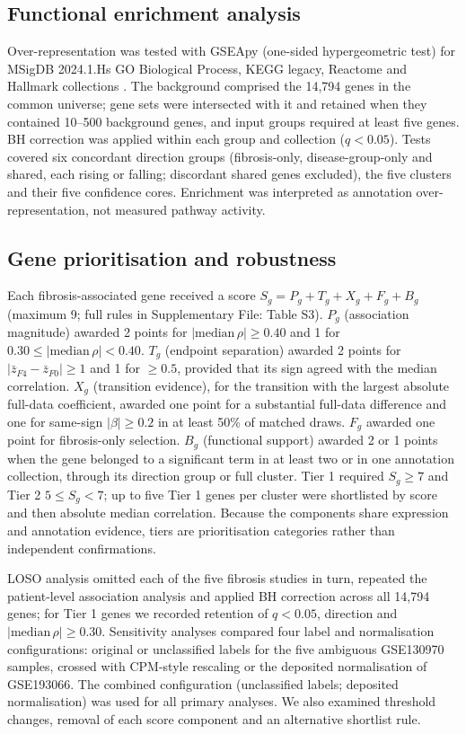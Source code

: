 \documentclass[11pt,a4paper]{article}
\begin{document}
\subsection*{Functional enrichment analysis}
Over-representation was tested with GSEApy \cite{fang2023} (one-sided hypergeometric test) for MSigDB 2024.1.Hs GO Biological Process, KEGG legacy, Reactome and Hallmark collections \cite{subramanian2005,liberzon2015}. The background comprised the 14,794 genes in the common universe; gene sets were intersected with it and retained when they contained 10--500 background genes, and input groups required at least five genes. BH correction was applied within each group and collection ($q<0.05$). Tests covered six concordant direction groups (fibrosis-only, disease-group-only and shared, each rising or falling; discordant shared genes excluded), the five clusters and their five confidence cores. Enrichment was interpreted as annotation over-representation, not measured pathway activity.

\subsection*{Gene prioritisation and robustness}
Each fibrosis-associated gene received a score $S_g=P_g+T_g+X_g+F_g+B_g$ (maximum 9; full rules in Supplementary File: Table S3). $P_g$ (association magnitude) awarded 2 points for $|\mathrm{median}\,\rho|\geq0.40$ and 1 for $0.30\leq|\mathrm{median}\,\rho|<0.40$. $T_g$ (endpoint separation) awarded 2 points for $|\bar z_{F4}-\bar z_{F0}|\geq1$ and 1 for $\geq0.5$, provided that its sign agreed with the median correlation. $X_g$ (transition evidence), for the transition with the largest absolute full-data coefficient, awarded one point for a substantial full-data difference and one for same-sign $|\beta|\geq0.2$ in at least 50\% of matched draws. $F_g$ awarded one point for fibrosis-only selection. $B_g$ (functional support) awarded 2 or 1 points when the gene belonged to a significant term in at least two or in one annotation collection, through its direction group or full cluster. Tier 1 required $S_g\geq7$ and Tier 2 $5\leq S_g<7$; up to five Tier 1 genes per cluster were shortlisted by score and then absolute median correlation. Because the components share expression and annotation evidence, tiers are prioritisation categories rather than independent confirmations.

LOSO analysis omitted each of the five fibrosis studies in turn, repeated the patient-level association analysis and applied BH correction across all 14,794 genes; for Tier 1 genes we recorded retention of $q<0.05$, direction and $|\mathrm{median}\,\rho|\geq0.30$. Sensitivity analyses compared four label and normalisation configurations: original or unclassified labels for the five ambiguous GSE130970 samples, crossed with CPM-style rescaling or the deposited normalisation of GSE193066. The combined configuration (unclassified labels; deposited normalisation) was used for all primary analyses. We also examined threshold changes, removal of each score component and an alternative shortlist rule.
\end{document}
